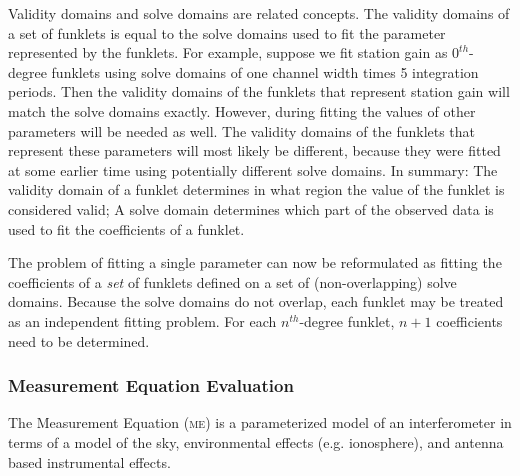 \documentclass[10pt]{lofar}
\newcommand{\me}{\textsc{me}\xspace}
\begin{document}
Validity domains and solve domains are related concepts. The validity domains of a set of funklets is equal to the solve domains used to fit the parameter represented by the funklets. For example, suppose we fit station gain as $0^{th}$-degree funklets using solve domains of one channel width times 5 integration periods. Then the validity domains of the funklets that represent station gain will match the solve domains exactly. However, during fitting the values of other parameters will be needed as well. The validity domains of the funklets that represent these parameters will most likely be different, because they were fitted at some earlier time using potentially different solve domains. In summary: The validity domain of a funklet determines in what region the value of the funklet is considered valid; A solve domain determines which part of the observed data is used to fit the coefficients of a funklet.

The problem of fitting a single parameter can now be reformulated as fitting the coefficients of a \emph{set} of funklets defined on a set of (non-overlapping) solve domains. Because the solve domains do not overlap, each funklet may be treated as an independent fitting problem. For each $n^{th}$-degree funklet, $n+1$ coefficients need to be determined.

\subsubsection{Measurement Equation Evaluation}
\label{subsubsec:design-me-evaluation}
The Measurement Equation (\me) \cite{LOFAR-ASTRON-ADD-015} is a parameterized model of an interferometer in terms of a model of the sky, environmental effects (e.g. ionosphere), and antenna based instrumental effects.
\end{document}
